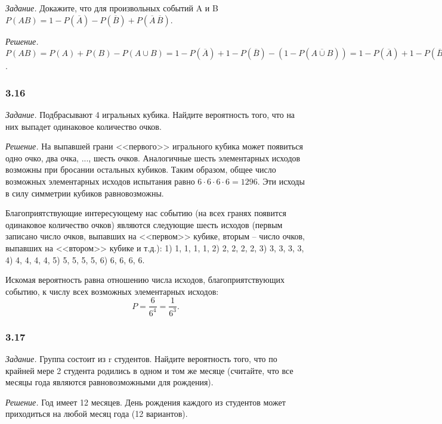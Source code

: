 \documentclass{book}
\begin{document}
\textit{Задание.} Докажите, что для произвольных событий A и B $P(AB)=1-P\left(\overline{A}\right)-P\left(\overline{B}\right)+P\left(\overline{A}\,\overline{B}\right)$.

\textit{Решение.} $P(AB)=P(A)+P(B)-P\left(A\cup B\right)=1-P\left(\overline{A}\right)+1-P\left(\overline{B}\right)-\left(1-P\left(\overline{A\cup B}\right)\right)=1-P\left(\overline{A}\right)+1-P\left(\overline{B}\right)-1+P\left(\overline{A}\,\overline{B}\right)=1-P\left(\overline{A}\right)-P\left(\overline{B}\right)+P\left(\overline{A}\,\overline{B}\right)$.

\subsubsection*{3.16}

\textit{Задание.} Подбрасывают 4 игральных кубика. Найдите вероятность того, что на них выпадет одинаковое количество очков.

\textit{Решение.} На выпавшей грани <<первого>> игрального кубика может появиться одно очко, два очка, ..., шесть очков. Аналогичные шесть элементарных исходов возможны при бросании остальных кубиков. Таким образом, общее число возможных элементарных исходов испытания равно $6\cdot 6\cdot 6\cdot 6=1296$. Эти исходы в силу симметрии кубиков равновозможны.

Благоприятствующие интересующему нас событию (на всех гранях появится одинаковое количество очков) являются следующие шесть исходов (первым записано число очков, выпавших на <<первом>> кубике, вторым -- число очков, выпавших на <<втором>> кубике и т.д.): 1) 1, 1, 1, 1, 2) 2, 2, 2, 2, 3) 3, 3, 3, 3, 4) 4, 4, 4, 4, 5) 5, 5, 5, 5, 6) 6, 6, 6, 6.

Искомая вероятность равна отношению числа исходов, благоприятствующих событию, к числу всех возможных элементарных исходов: $$P=\frac{6}{6^4}=\frac{1}{6^3}.$$

\subsubsection*{3.17}

\textit{Задание.} Группа состоит из r студентов. Найдите вероятность того, что по крайней мере 2 студента родились в одном и том же месяце (считайте, что все месяцы года являются равновозможными для рождения).

\textit{Решение.} Год имеет 12 месяцев. День рождения каждого из студентов может приходиться на любой месяц года (12 вариантов).
\end{document}
